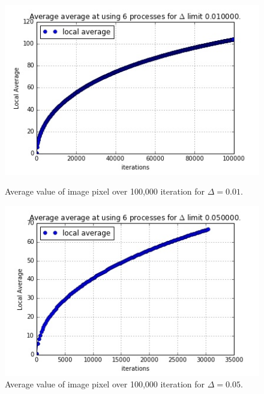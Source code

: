 \documentclass[11pt]{article}
\begin{document}
	\begin{figure}[ht]	
		\centering
		\begin{minipage}[b]{.5\textwidth}
			\centering
			\includegraphics[width=\linewidth]{local_avg_6_010000.jpeg}
			\caption{Average value of image pixel over 100,000 iteration for $\Delta=0.01$.}\label{avg1}
		\end{minipage}%
		\begin{minipage}[b]{.5\textwidth}
			\centering
			\includegraphics[width=\linewidth]{local_avg_6_050000.jpeg}
			\caption{Average value of image pixel over 100,000 iteration for $\Delta=0.05$.}\label{avg2}
		\end{minipage}
	\end{figure}
	

	
\end{document}

